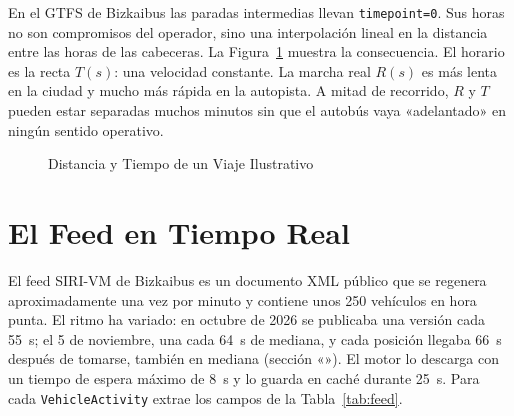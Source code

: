 En el GTFS de Bizkaibus las paradas intermedias llevan \texttt{timepoint=0}. Sus horas no son compromisos del
operador, sino una interpolación lineal en la distancia entre las horas de las cabeceras. La
Figura~\ref{fig:distancia-tiempo} muestra la consecuencia. El horario es la recta $T(s)$: una velocidad constante. La
marcha real $R(s)$ es más lenta en la ciudad y mucho más rápida en la autopista. A mitad de recorrido, $R$ y $T$
pueden estar separadas muchos minutos sin que el autobús vaya «adelantado» en ningún sentido operativo.

\begin{figure}[ht]
\centering
\caption{Distancia y Tiempo de un Viaje Ilustrativo}\label{fig:distancia-tiempo}
\end{figure}

\section{El Feed en Tiempo Real}
\label{sec:feed}

El feed SIRI-VM de Bizkaibus es un documento XML público que se regenera aproximadamente una vez por minuto y contiene
unos 250 vehículos en hora punta. El ritmo ha variado: en octubre de 2026 se publicaba una versión cada 55~s; el 5 de
noviembre, una cada 64~s de mediana, y cada posición llegaba 66~s después de tomarse, también en mediana (sección
«»). El motor lo descarga con un tiempo de espera máximo de 8~s y lo guarda en caché durante
25~s. Para cada \texttt{VehicleActivity} extrae
los campos de la Tabla~\ref{tab:feed}.

